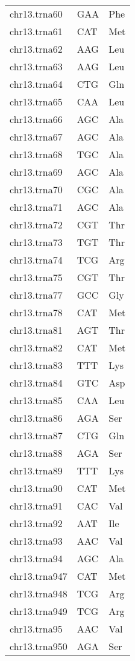 \begin{longtable}{@{}l>{\collectcell\anticodon}l<{\endcollectcell}l@{}}
    chr13.trna60 & GAA & Phe \\
    chr13.trna61 & CAT & Met \\
    chr13.trna62 & AAG & Leu \\
    chr13.trna63 & AAG & Leu \\
    chr13.trna64 & CTG & Gln \\
    chr13.trna65 & CAA & Leu \\
    chr13.trna66 & AGC & Ala \\
    chr13.trna67 & AGC & Ala \\
    chr13.trna68 & TGC & Ala \\
    chr13.trna69 & AGC & Ala \\
    chr13.trna70 & CGC & Ala \\
    chr13.trna71 & AGC & Ala \\
    chr13.trna72 & CGT & Thr \\
    chr13.trna73 & TGT & Thr \\
    chr13.trna74 & TCG & Arg \\
    chr13.trna75 & CGT & Thr \\
    chr13.trna77 & GCC & Gly \\
    chr13.trna78 & CAT & Met \\
    chr13.trna81 & AGT & Thr \\
    chr13.trna82 & CAT & Met \\
    chr13.trna83 & TTT & Lys \\
    chr13.trna84 & GTC & Asp \\
    chr13.trna85 & CAA & Leu \\
    chr13.trna86 & AGA & Ser \\
    chr13.trna87 & CTG & Gln \\
    chr13.trna88 & AGA & Ser \\
    chr13.trna89 & TTT & Lys \\
    chr13.trna90 & CAT & Met \\
    chr13.trna91 & CAC & Val \\
    chr13.trna92 & AAT & Ile \\
    chr13.trna93 & AAC & Val \\
    chr13.trna94 & AGC & Ala \\
    chr13.trna947 & CAT & Met \\
    chr13.trna948 & TCG & Arg \\
    chr13.trna949 & TCG & Arg \\
    chr13.trna95 & AAC & Val \\
    chr13.trna950 & AGA & Ser \\

\end{longtable}
